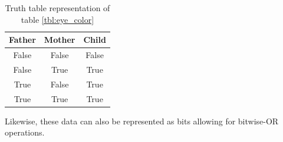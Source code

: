 \documentclass{article}
\renewcommand{\_}{\ifincsname_\else\legacyunderscore\fi}
\begin{document}
    \begin{table}[h]
        \centering
        \begin{tabular}{|c|c|c|}
            \hline
            Father & Mother & Child \\
            \hline
            False  & False  & False \\
            \hline
            False  & True   & True \\
            \hline            
            True   & False  & True \\
            \hline
            True   & True   & True \\
            \hline
        \end{tabular}
        \caption{Truth table representation of table \ref{tbl:eye_color}}
        \label{tbl:eye_color_truth}
    \end{table}

    Likewise, these data can also be represented as bits allowing for bitwise-OR operations.
\newpage
\end{document}
